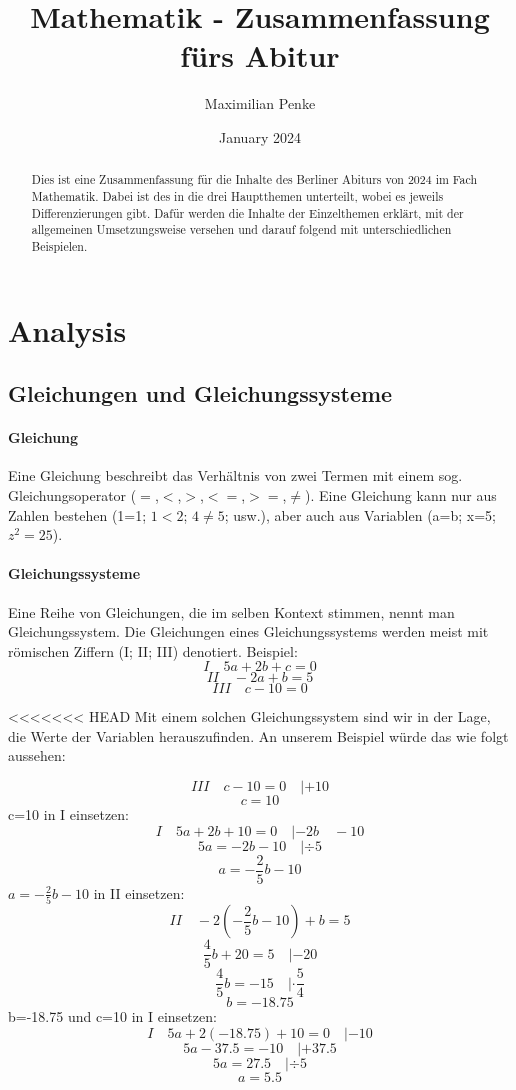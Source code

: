 \documentclass{article}
\title{Mathematik - Zusammenfassung fürs Abitur}
\author{Maximilian Penke}
\date{January 2024}
\begin{document}
\maketitle

\begin{abstract}
    Dies ist eine Zusammenfassung für die Inhalte des Berliner Abiturs von 2024 im Fach Mathematik. Dabei ist des in die drei Hauptthemen unterteilt, wobei es jeweils Differenzierungen gibt. Dafür werden die Inhalte der Einzelthemen erklärt, mit der allgemeinen Umsetzungsweise versehen und darauf folgend mit unterschiedlichen Beispielen.
\end{abstract}

\tableofcontents
\newpage

\section{Analysis}
	\subsection{Gleichungen und Gleichungssysteme}
		\paragraph{Gleichung}
			Eine Gleichung beschreibt das Verhältnis von zwei Termen mit einem sog. Gleichungsoperator ($=$,$<$,$>$,$<=$,$>=$,$\neq$).
			Eine Gleichung kann nur aus Zahlen bestehen (1=1; $1<2$; $4\neq5$; usw.),
			aber auch aus Variablen (a=b; x=5; $z^2=25$).
		\paragraph{Gleichungssysteme}\label{Gleichungssysteme}
			Eine Reihe von Gleichungen, die im selben Kontext stimmen, nennt man Gleichungssystem. Die Gleichungen eines Gleichungssystems werden meist
			mit römischen Ziffern (I; II; III) denotiert. Beispiel:
			\[ I \quad 5a+2b+c=0\]
			\[ II \quad -2a+b=5\]
			\[ III \quad c-10=0\]

<<<<<<< HEAD
			Mit einem solchen Gleichungssystem sind wir in der Lage, die Werte der Variablen herauszufinden.  An unserem Beispiel würde das wie folgt aussehen:
			
			\[ III \quad c-10=0 \quad | +10 \]
			\[c = 10\]
			c=10 in I einsetzen: 
			\[ I \quad 5a+2b+10=0 \quad | -2b \quad -10\]
			\[ 5a=-2b-10 \quad | \div 5\]
			\[a=-\frac{2}{5}b-10\]
			$a=-\frac{2}{5}b-10$ in II einsetzen:
			\[ II \quad -2(-\frac{2}{5}b-10)+b=5\]
			\[ \frac{4}{5}b+20=5 \quad | -20\]
			\[ \frac{4}{5}b=-15 \quad |\cdot \frac{5}{4} \]
			\[ b=-18.75\]
			b=-18.75 und c=10 in I einsetzen:
			\[ I \quad 5a+2(-18.75)+10=0 \quad | -10 \]
			\[ 5a-37.5=-10 \quad |+37.5 \]
			\[ 5a = 27.5 \quad | \div 5\]
			\[ a = 5.5\]
			
\end{document}
